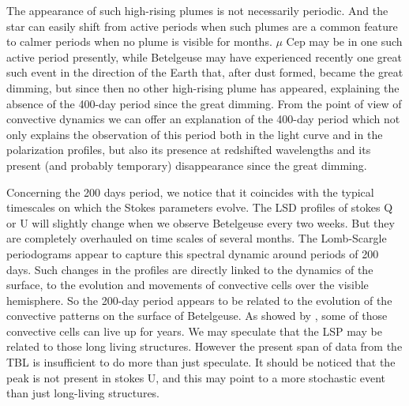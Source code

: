 \documentclass{aa}
\begin{document}
The appearance of such high-rising plumes is not necessarily periodic. And the star can easily shift from active periods when such 
plumes are a common feature to calmer periods when no plume is visible for months. $\mu$ Cep may be in one such active period presently,
while Betelgeuse may have experienced recently one great such event in the direction of the Earth that, after dust formed, became the great 
dimming, but since then no other high-rising plume has appeared, explaining the absence of the 400-day period since the great dimming. 
From the point of view of convective dynamics we can offer an explanation of the 400-day period which not only explains the observation of 
this period both in the light curve and in the polarization profiles, but also its presence at redshifted wavelengths and its present (and probably 
temporary) disappearance since the great dimming.



Concerning the 200 days period, we notice that it coincides with  the typical timescales on which the Stokes parameters evolve. 
The 
LSD profiles of stokes Q or U will slightly change when we observe Betelgeuse every two weeks. But they are completely overhauled 
on time scales of several months. The Lomb-Scargle periodograms appear to capture this spectral dynamic around periods of 200 days.
 Such changes in the profiles are directly linked to the dynamics of the surface,  to  the evolution and movements 
of convective cells over the visible hemisphere. So the 200-day period appears to be related to the evolution of the convective patterns 
on the surface of Betelgeuse. 
 As showed by
\cite{lopez_ariste_convective_2018}, some of those convective cells can live up for years. We may speculate
that the LSP may be related to those long living structures. However the present span of data from the TBL is insufficient to do more than
just speculate. It should be noticed that  
 the peak is not present in stokes U, and this may point to a more stochastic event than just long-living structures.
\end{document}
